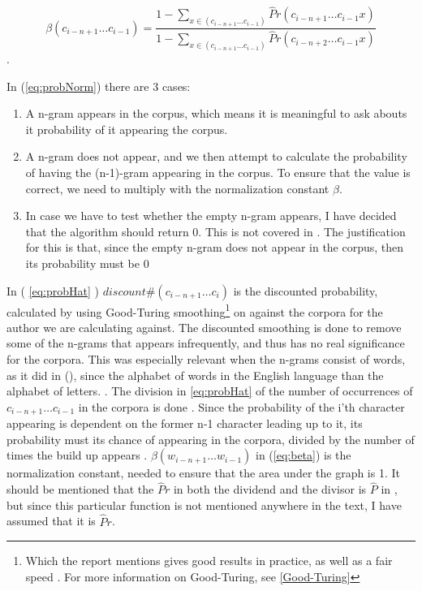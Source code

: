 \begin{equation}
\label{eq:beta}
\beta(c_{i - n + 1} \ldots c_{i-1}) = 
\frac
{1 - \sum_{x \in (c_{i - n + 1} \ldots c_{i-1})}\hat{P}r(c_{i - n + 1} \ldots c_{i-1} x)}
{1 - \sum_{x \in (c_{i - n + 1} \ldots c_{i-1})}\hat{P}r(c_{i - n + 2} \ldots c_{i-1} x)}
\end{equation}.

In (\ref{eq:probNorm}) there are 3 cases:
\begin{enumerate}
\item A n-gram appears in the corpus, which means it is meaningful to ask abouts it probability of it appearing the corpus.
\item  A n-gram does not appear, and we then attempt to calculate the probability of having the (n-1)-gram appearing in the corpus. To ensure that the value is correct, we need to multiply with the normalization constant $\beta$. 
\item In case we have to test whether the empty n-gram appears, I have decided that the algorithm should return 0. This is not covered in \cite{nr4}. The justification for this is that, since the empty n-gram does not appear in the corpus, then its probability must be 0
\end{enumerate}
In ( \ref{eq:probHat} ) $discount\#(c_{i - n + 1} \ldots c_{i})$ 
is the discounted probability, calculated by using Good-Turing smoothing\footnote{Which the report mentions gives good results in practice, as well as a fair speed \cite{nr4}. For more information on Good-Turing, see \ref{Good-Turing}} on against the corpora for the author we are calculating against. The discounted smoothing is done to remove some of the n-grams that appears infrequently, and thus has no real significance for the corpora. This was especially relevant when the n-grams consist of words, as it did in (\cite{nr4}), since the alphabet of words in the English language than the alphabet of letters. . The division in \ref{eq:probHat} of the number of occurrences of $c_{i - n + 1} \ldots c_{i - 1}$ in the corpora is done . Since the probability of the i'th character appearing is dependent on the former n-1 character leading up to it, its probability must its chance of appearing in the corpora, divided by the number of times the build up appears .
$\beta (w_{i - n + 1}\ldots w_{i -1})$ in (\ref{eq:beta}) is the normalization constant, needed to ensure that the area under the graph is 1. It should be mentioned that the $\hat{P}r$ in both the dividend and the divisor is $\hat{P}$ in \cite{nr4}, but since this particular function is not mentioned anywhere in the text, I have assumed that it is $\hat{P}r$.


